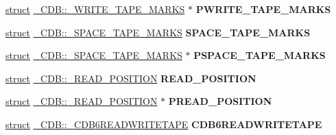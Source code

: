 \begin{DoxyCompactItemize}
\item 
\mbox{\label{union___c_d_b_acfa16774edc2ce3b3d434343d71a9952}} 
\hyperlink{interfacestruct}{struct} \hyperlink{struct___c_d_b_1_1___w_r_i_t_e___t_a_p_e___m_a_r_k_s}{\+\_\+\+C\+D\+B\+::\+\_\+\+W\+R\+I\+T\+E\+\_\+\+T\+A\+P\+E\+\_\+\+M\+A\+R\+KS} $\ast$ {\bfseries P\+W\+R\+I\+T\+E\+\_\+\+T\+A\+P\+E\+\_\+\+M\+A\+R\+KS}
\item 
\mbox{\label{union___c_d_b_a54055b3db25f8c2e177fc00cf8cbdca1}} 
\hyperlink{interfacestruct}{struct} \hyperlink{struct___c_d_b_1_1___s_p_a_c_e___t_a_p_e___m_a_r_k_s}{\+\_\+\+C\+D\+B\+::\+\_\+\+S\+P\+A\+C\+E\+\_\+\+T\+A\+P\+E\+\_\+\+M\+A\+R\+KS} {\bfseries S\+P\+A\+C\+E\+\_\+\+T\+A\+P\+E\+\_\+\+M\+A\+R\+KS}
\item 
\mbox{\label{union___c_d_b_ae7009886a71f0c89da5f0b71764cb171}} 
\hyperlink{interfacestruct}{struct} \hyperlink{struct___c_d_b_1_1___s_p_a_c_e___t_a_p_e___m_a_r_k_s}{\+\_\+\+C\+D\+B\+::\+\_\+\+S\+P\+A\+C\+E\+\_\+\+T\+A\+P\+E\+\_\+\+M\+A\+R\+KS} $\ast$ {\bfseries P\+S\+P\+A\+C\+E\+\_\+\+T\+A\+P\+E\+\_\+\+M\+A\+R\+KS}
\item 
\mbox{\label{union___c_d_b_af197c9fdd15d9ca85eaff63fe99aca00}} 
\hyperlink{interfacestruct}{struct} \hyperlink{struct___c_d_b_1_1___r_e_a_d___p_o_s_i_t_i_o_n}{\+\_\+\+C\+D\+B\+::\+\_\+\+R\+E\+A\+D\+\_\+\+P\+O\+S\+I\+T\+I\+ON} {\bfseries R\+E\+A\+D\+\_\+\+P\+O\+S\+I\+T\+I\+ON}
\item 
\mbox{\label{union___c_d_b_a648e4b61c7a957609e10ce6986cf4900}} 
\hyperlink{interfacestruct}{struct} \hyperlink{struct___c_d_b_1_1___r_e_a_d___p_o_s_i_t_i_o_n}{\+\_\+\+C\+D\+B\+::\+\_\+\+R\+E\+A\+D\+\_\+\+P\+O\+S\+I\+T\+I\+ON} $\ast$ {\bfseries P\+R\+E\+A\+D\+\_\+\+P\+O\+S\+I\+T\+I\+ON}
\item 
\mbox{\label{union___c_d_b_a5bb8ebbbd2ab30ec4ebfe8982168d1fc}} 
\hyperlink{interfacestruct}{struct} \hyperlink{struct___c_d_b_1_1___c_d_b6_r_e_a_d_w_r_i_t_e_t_a_p_e}{\+\_\+\+C\+D\+B\+::\+\_\+\+C\+D\+B6\+R\+E\+A\+D\+W\+R\+I\+T\+E\+T\+A\+PE} {\bfseries C\+D\+B6\+R\+E\+A\+D\+W\+R\+I\+T\+E\+T\+A\+PE}
\item 
\mbox{\label{union___c_d_b_a08a87290ee9972d04a72755a6fed166d}} 

\end{DoxyCompactItemize}
